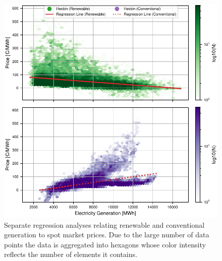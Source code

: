 \documentclass{article}
\begin{document}


\begin{figure}[h]
    \centering
    \includegraphics[width=\columnwidth]{doc/fig/ren_vs_con_regression_separate.pdf}
    \caption{Separate regression analyses relating renewable and conventional generation to spot market prices. Due to the large number of data points the data is aggregated into hexagons whose color intensity reflects the number of elements it contains.}
    \label{fig:ren_vs_con_regression}
\end{figure}
\end{document}
